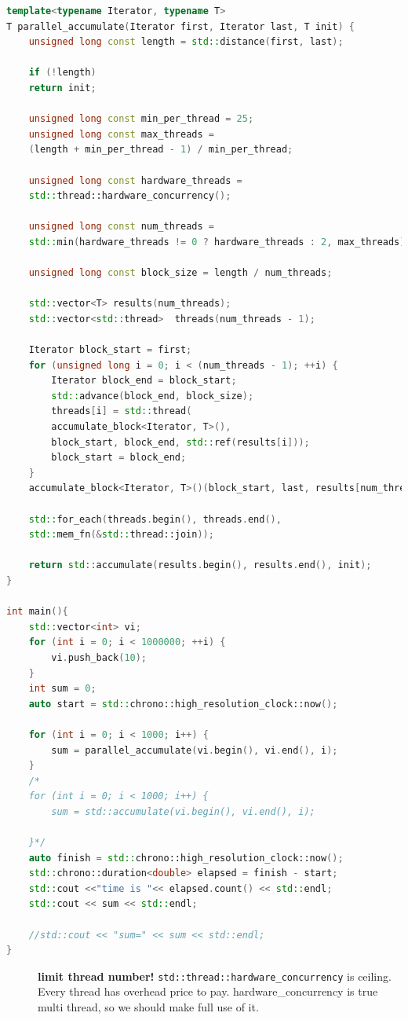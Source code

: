 \documentclass[a4paper,11pt,twoside]{book}
\begin{document}
\begin{itemize}
\begin{lstlisting}[frame=single, language=c++]
template<typename Iterator, typename T>
T parallel_accumulate(Iterator first, Iterator last, T init) {
	unsigned long const length = std::distance(first, last);
	
	if (!length)
	return init;
	
	unsigned long const min_per_thread = 25;
	unsigned long const max_threads =
	(length + min_per_thread - 1) / min_per_thread;
	
	unsigned long const hardware_threads =
	std::thread::hardware_concurrency();
	
	unsigned long const num_threads =
	std::min(hardware_threads != 0 ? hardware_threads : 2, max_threads);
	
	unsigned long const block_size = length / num_threads;
	
	std::vector<T> results(num_threads);
	std::vector<std::thread>  threads(num_threads - 1);
	
	Iterator block_start = first;
	for (unsigned long i = 0; i < (num_threads - 1); ++i) {
		Iterator block_end = block_start;
		std::advance(block_end, block_size);
		threads[i] = std::thread(
		accumulate_block<Iterator, T>(),
		block_start, block_end, std::ref(results[i]));
		block_start = block_end;
	}
	accumulate_block<Iterator, T>()(block_start, last, results[num_threads - 1]);
	
	std::for_each(threads.begin(), threads.end(),
	std::mem_fn(&std::thread::join));
	
	return std::accumulate(results.begin(), results.end(), init);
}

int main(){
	std::vector<int> vi;
	for (int i = 0; i < 1000000; ++i) {
		vi.push_back(10);
	}
	int sum = 0;
	auto start = std::chrono::high_resolution_clock::now();
	
	for (int i = 0; i < 1000; i++) {
		sum = parallel_accumulate(vi.begin(), vi.end(), i);
	}
	/*
	for (int i = 0; i < 1000; i++) {
		sum = std::accumulate(vi.begin(), vi.end(), i);
		
	}*/
	auto finish = std::chrono::high_resolution_clock::now();
	std::chrono::duration<double> elapsed = finish - start;
	std::cout <<"time is "<< elapsed.count() << std::endl;
	std::cout << sum << std::endl;
	
	//std::cout << "sum=" << sum << std::endl;
}	
\end{lstlisting}	
	\begin{description}
		\item[] \textbf{limit thread number!} \texttt{std::thread::hardware\_concurrency} is ceiling. Every thread has overhead price to pay. hardware\_concurrency is true multi thread, so we should make full use of it. 
	\end{description}
	
	\end{itemize}
\end{document}
